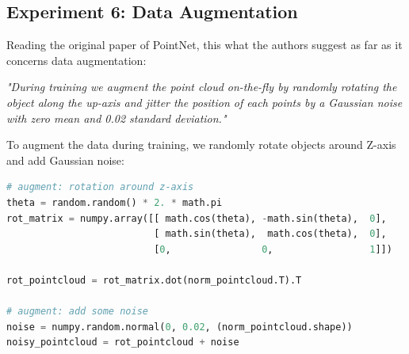 \documentclass[11pt,a4paper]{article}
\begin{document}
\subsection{Experiment 6: Data Augmentation}
Reading the original paper of PointNet, this what the authors suggest as far as it concerns data augmentation:
\begin{displayquote}
\textit{"During training we augment the point cloud on-the-fly by randomly rotating the object along the up-axis and jitter the position of each points by a Gaussian noise with zero mean and 0.02 standard deviation."}
\end{displayquote}
To augment the data during training, we randomly rotate objects around Z-axis and add Gaussian noise:
\begin{lstlisting}[language=Python,frame=single]
# augment: rotation around z-axis
theta = random.random() * 2. * math.pi
rot_matrix = numpy.array([[ math.cos(theta), -math.sin(theta),  0],
                          [ math.sin(theta),  math.cos(theta),  0],
                          [0,                0,                 1]])

rot_pointcloud = rot_matrix.dot(norm_pointcloud.T).T

# augment: add some noise
noise = numpy.random.normal(0, 0.02, (norm_pointcloud.shape))
noisy_pointcloud = rot_pointcloud + noise
\end{lstlisting}
\end{document}
